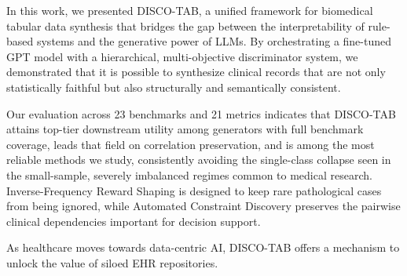 In this work, we presented DISCO-TAB, a unified framework for biomedical tabular data synthesis that bridges the gap between the interpretability of rule-based systems and the generative power of LLMs. By orchestrating a fine-tuned GPT model with a hierarchical, multi-objective discriminator system, we demonstrated that it is possible to synthesize clinical records that are not only statistically faithful but also structurally and semantically consistent.

Our evaluation across 23 benchmarks and 21 metrics indicates that DISCO-TAB attains top-tier downstream utility among generators with full benchmark coverage, leads that field on correlation preservation, and is among the most reliable methods we study, consistently avoiding the single-class collapse seen in the small-sample, severely imbalanced regimes common to medical research. Inverse-Frequency Reward Shaping is designed to keep rare pathological cases from being ignored, while Automated Constraint Discovery preserves the pairwise clinical dependencies important for decision support.

As healthcare moves towards data-centric AI, DISCO-TAB offers a  mechanism to  unlock the value of siloed EHR repositories. 